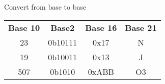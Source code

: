 \documentclass{article}
\begin{document}
\noindent Convert from base to base\\
\begin{tabular}{c|c|c|c}
\textbf{Base 10}&\textbf{Base2}&\textbf{Base 16} & \textbf{Base 21}\\
23 & 0b10111 & 0x17 & N \\
19 & 0b10011 & 0x13 & J \\
507 & 0b1010 & 0xABB & O3 \\
\hline
\hline
\end{tabular}
\end{document}

